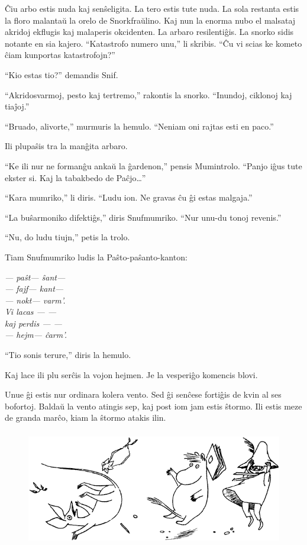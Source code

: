 Ĉiu arbo estis nuda kaj senŝeligita. La tero estis tute nuda. La sola restanta estis la floro malantaŭ la orelo de Snorkfraŭlino. Kaj nun la enorma nubo el malsataj akridoj ekflugis kaj malaperis okcidenten. La arbaro resilentiĝis. La snorko sidis notante en sia kajero. ``Katastrofo numero unu,'' li skribis. ``Ĉu vi scias ke kometo ĉiam kunportas katastrofojn?''

``Kio estas tio?'' demandis Snif.

``Akridosvarmoj, pesto kaj tertremo,'' rakontis la snorko. ``Inundoj, ciklonoj kaj tiaĵoj.''

``Bruado, alivorte,'' murmuris la hemulo. ``Neniam oni rajtas esti en paco.''

Ili plupaŝis tra la manĝita arbaro.

``Ke ili nur ne formanĝu ankaŭ la ĝardenon,'' pensis Mumintrolo. ``Panjo iĝus tute ekster si. Kaj la tabakbedo de Paĉjo{\ldots}''

``Kara mumriko,'' li diris. ``Ludu ion. Ne gravas ĉu ĝi estas malgaja.''

``La buŝarmoniko difektiĝs,'' diris Snufmumriko. ``Nur unu-du tonoj revenis.''

``Nu, do ludu tiujn,'' petis la trolo.

Tiam Snufmumriko ludis la Paŝto-paŝanto-kanton:

\begin{center}\itshape --- paŝt--- ŝant---\\
--- fajf--- kant---\\
--- nokt--- varm'.\\
Vi lacas --- ---\\
kaj perdis --- ---\\
--- hejm--- ĉarm'.\\\end{center}

``Tio sonis terure,'' diris la hemulo.

Kaj lace ili plu serĉis la vojon hejmen. Je la vesperiĝo komencis blovi.

Unue ĝi estis nur ordinara kolera vento. Sed ĝi senĉese fortiĝis de kvin al ses bofortoj. Baldaŭ la vento atingis sep, kaj post iom jam estis ŝtormo. Ili estis meze de granda marĉo, kiam la ŝtormo atakis ilin.

\begin{figure}[htbp]
\centering
\includegraphics[width=350pt,height=143pt]{8-6.png}
\caption{}
\label{8-6}
\end{figure}

